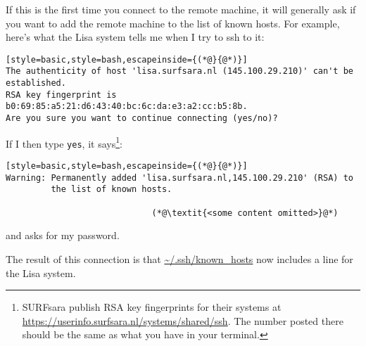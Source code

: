 If this is the first time you connect to the remote machine, it will generally ask if you want to add the remote machine to the list of known hosts. For example, here's what the Lisa system tells me when I try to ssh to it:
\begin{lstlisting}[style=basic,style=bash,escapeinside={(*@}{@*)}]
The authenticity of host 'lisa.surfsara.nl (145.100.29.210)' can't be
established.
RSA key fingerprint is b0:69:85:a5:21:d6:43:40:bc:6c:da:e3:a2:cc:b5:8b.
Are you sure you want to continue connecting (yes/no)?
\end{lstlisting}
If I then type \texttt{yes}, it says\footnote{SURFsara publish RSA key fingerprints for their systems at \url{https://userinfo.surfsara.nl/systems/shared/ssh}. The number posted there should be the same as what you have in your terminal.}:
\begin{lstlisting}[style=basic,style=bash,escapeinside={(*@}{@*)}]
Warning: Permanently added 'lisa.surfsara.nl,145.100.29.210' (RSA) to
         the list of known hosts.

                             (*@\textit{<some content omitted>}@*)
\end{lstlisting}
and asks for my password.

The result of this connection is that \url{~/.ssh/known_hosts} now includes a line for the Lisa system.










